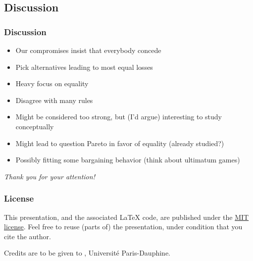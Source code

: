 \documentclass[french, english]{beamer}
\begin{document}
\subsection{Discussion}
\begin{frame}
	\frametitle{Discussion}
	\begin{itemize}
		\item Our compromises insist that everybody concede
		\item Pick alternatives leading to most equal losses
		\item Heavy focus on equality
		\item Disagree with many rules
		\item Might be considered too strong, but (I’d argue) interesting to study conceptually
		\item Might lead to question Pareto in favor of equality (already studied?)
		\item Possibly fitting some bargaining behavior (think about ultimatum games)
	\end{itemize}
\end{frame}

\begin{frame}[plain]
	\addtocounter{framenumber}{-1}
	\begin{center}
		\huge
		\textit{Thank you for your attention!}
	\end{center}
\end{frame}

\appendix
\AtBeginSection{
}

\begin{frame}[allowframebreaks]
	\frametitle{\refname}
 	
\end{frame}

\clearpage{}
\begin{frame}[plain]
	\frametitle{License}
	This presentation, and the associated \LaTeX{} code, are published under the \href{https://opensource.org/licenses/MIT}{MIT license}. Feel free to reuse (parts of) the presentation, under condition that you cite the author.
	
	Credits are to be given to , Université Paris-Dauphine.
\end{frame}
\addtocounter{framenumber}{-1}
\end{document}
